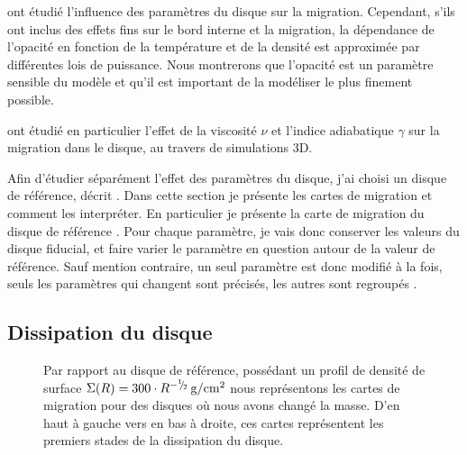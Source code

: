 \cite{kretke2012importance} ont étudié l'influence des paramètres du disque sur la migration. Cependant, s'ils ont inclus des
effets fins sur le bord interne et la migration, la dépendance de l'opacité en fonction de la température et de la densité est
approximée par différentes lois de puissance. Nous montrerons que l'opacité est un paramètre sensible du modèle et qu'il est
important de la modéliser le plus finement possible. 

\cite{bitsch2013influence} ont étudié en particulier l'effet de la viscosité $\nu$ et l'indice adiabatique $\gamma$ sur la
migration dans le disque, au travers de simulations 3D. 

Afin d'étudier séparément l'effet des paramètres du disque, j'ai choisi un disque de référence, décrit
. Dans cette section je présente les cartes de migration et comment les interpréter. En particulier
je présente la carte de migration du disque de référence . Pour chaque paramètre, je vais
donc conserver les valeurs du disque fiducial, et faire varier le paramètre en question autour de la valeur de référence. Sauf
mention contraire, un seul paramètre est donc modifié à la fois, seuls les paramètres qui changent sont précisés, les autres
sont regroupés .






\subsection{Dissipation du disque}

\begin{figure}[htb]
\centering
{}\hfill
{}

\hfill
{}

\caption{Par rapport au disque de référence, possédant un profil de densité de surface $\Sigma(R) = 300 \cdot
R^{-{{}^{1\!\!}/ _{\!2}}}\mathrm{\thinspace g/cm^2}$ nous représentons les cartes de migration pour des disques où nous avons changé la masse. D'en haut à gauche vers en bas à droite, ces cartes représentent les premiers stades de la dissipation du disque. }\label{fig:map_total_mass}
\end{figure}


